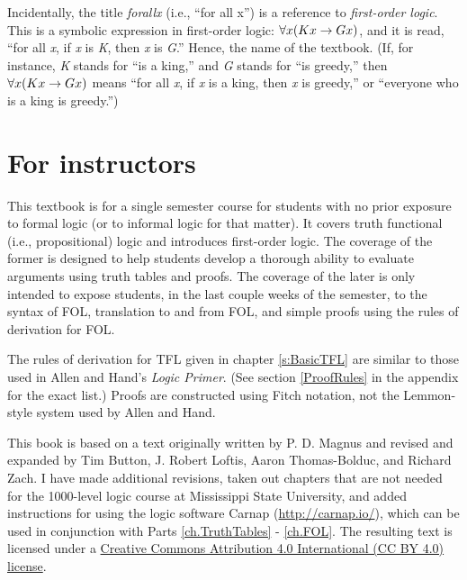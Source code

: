 Incidentally, the title \textit{forall\hspace{.10em}x} (i.e., ``for all x'') is a reference to \textit{first-order logic}. This is a symbolic expression in first-order logic: $\forall x(Kx \rightarrow Gx)$, and it is read, “for all \textit{x}, if \textit{x} is \textit{K}, then \textit{x} is \textit{G}.” Hence, the name of the textbook. (If, for instance, \textit{K} stands for ``is a king,'' and \textit{G} stands for ``is greedy,'' then $\forall x(Kx \rightarrow Gx)$ means ``for all \textit{x}, if \textit{x} is a king, then \textit{x} is greedy,'' or ``everyone who is a king is greedy.'') 


\section{For instructors}

This textbook is for a single semester course for students with no prior exposure to formal logic (or to informal logic for that matter). It covers truth functional (i.e., propositional) logic and introduces first-order logic. The coverage of the former is designed to help students develop a thorough ability to evaluate arguments using truth tables and proofs. The coverage of the later is only intended to expose students, in the last couple weeks of the semester, to the syntax of FOL, translation to and from FOL, and simple proofs using the rules of derivation for FOL. 

The rules of derivation for TFL given in chapter \ref{s:BasicTFL} are similar to those used in Allen and Hand's \textit{Logic Primer}. (See section \ref{ProofRules} in the appendix for the exact list.) Proofs are constructed using Fitch notation, not the Lemmon-style system used by Allen and Hand.

This book is based on a text originally written by P. D. Magnus and revised and expanded by Tim Button, J. Robert Loftis, Aaron Thomas-Bolduc, and Richard Zach. I have made additional revisions, taken out chapters that are not needed for the 1000-level logic course at Mississippi State University, and added instructions for using the logic software Carnap (\href{http://carnap.io/}{http://carnap.io/}), which can be used in conjunction with Parts \ref{ch.TruthTables} - \ref{ch.FOL}. The resulting text is licensed under a \href{https://creativecommons.org/licenses/by/4.0/}{Creative Commons Attribution 4.0 International (CC BY 4.0) license}.

 